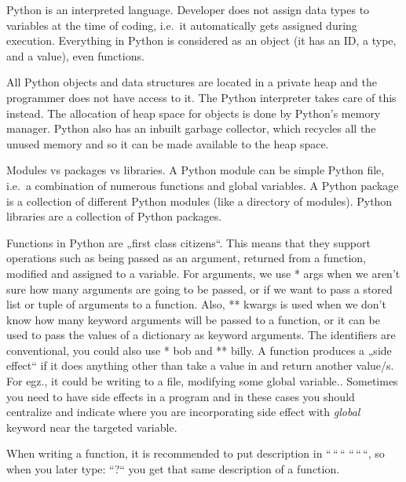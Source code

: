 \documentclass[
  letterpaper,
]{book}
\begin{document}
Python is an interpreted language. Developer does not assign data types
to variables at the time of coding, i.e.~it automatically gets assigned
during execution. Everything in Python is considered as an object (it
has an ID, a type, and a value), even functions.

All Python objects and data structures are located in a private heap and
the programmer does not have access to it. The Python interpreter takes
care of this instead. The allocation of heap space for objects is done
by Python's memory manager. Python also has an inbuilt garbage
collector, which recycles all the unused memory and so it can be made
available to the heap space.

Modules vs packages vs libraries. A Python module can be simple Python
file, i.e.~a combination of numerous functions and global variables. A
Python package is a collection of different Python modules (like a
directory of modules). Python libraries are a collection of Python
packages.

Functions in Python are „first class citizens``. This means that they
support operations such as being passed as an argument, returned from a
function, modified and assigned to a variable. For arguments, we use *
args when we aren't sure how many arguments are going to be passed, or
if we want to pass a stored list or tuple of arguments to a function.
Also, ** kwargs is used when we don't know how many keyword arguments
will be passed to a function, or it can be used to pass the values of a
dictionary as keyword arguments. The identifiers are conventional, you
could also use * bob and ** billy. A function produces a „side effect``
if it does anything other than take a value in and return another
value/s. For egz., it could be writing to a file, modifying some global
variable.. Sometimes you need to have side effects in a program and in
these cases you should centralize and indicate where you are
incorporating side effect with \emph{global} keyword near the targeted
variable.

\begin{tcolorbox}[enhanced jigsaw, arc=.35mm, bottomtitle=1mm, opacitybacktitle=0.6, bottomrule=.15mm, toptitle=1mm, title=\textcolor{quarto-callout-tip-color}{\faLightbulb}\hspace{0.5em}{Tip}, colbacktitle=quarto-callout-tip-color!10!white, toprule=.15mm, colback=white, opacityback=0, rightrule=.15mm, breakable, titlerule=0mm, left=2mm, leftrule=.75mm, colframe=quarto-callout-tip-color-frame, coltitle=black]

When writing a function, it is recommended to put description in
``\,``\,`` ``\,``\,``, so when you later type: ``?{}`` you get that same
description of a function.

\end{tcolorbox}
\end{document}
